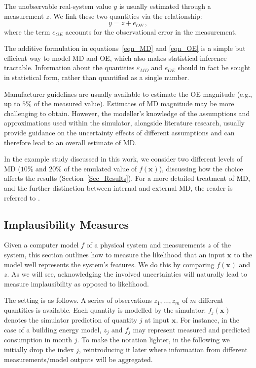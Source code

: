 \documentclass[preprint,12pt, sort&compress]{elsarticle}
\newcommand{\bd}[1]{\boldsymbol{#1}}
\newcommand{\x}[1][]{\bd{x_{#1}}}
\begin{document}
The unobservable real-system value $y$ is usually estimated through a measurement $z$. We link these two quantities via the relationship:
\begin{equation}\label{eqn_OE}
y = z + e_{OE}\,,
\end{equation}
where the term $e_{OE}$ accounts for the observational error in the measurement.

The additive formulation in equations~\eqref{eqn_MD} and \eqref{eqn_OE} is a simple but efficient way to model MD and OE, which also makes statistical inference tractable. Information about the quantities $ \varepsilon_{MD}$ and $e_{OE}$ should in fact be sought in statistical form, rather than quantified as a single number.

Manufacturer guidelines are usually available to estimate the OE magnitude (e.g., up to $5\%$ of the measured value). Estimates of MD magnitude may be more challenging to obtain. However, the modeller’s knowledge of the assumptions and approximations used within the simulator, alongside literature research, usually provide guidance on the uncertainty effects of different assumptions and can therefore lead to an overall estimate of MD.

In the example study discussed in this work, we consider two different levels of MD ($10\%$ and $20\%$ of the emulated value of $f(\x)$), discussing how the choice affects the results (Section~\ref{Sec_Results}). For a more detailed treatment of MD, and the further distinction between internal and external MD, the reader is referred to \cite{goldstein2017}.


\subsection{Implausibility Measures}\label{Subsec_IM}
Given a computer model $f$ of a physical system and measurements $z$ of the system, this section outlines how to measure the likelihood that an input $\x$ to the model well represents the system’s features. We do this by comparing $f(\x)$ and $z$. As we will see, acknowledging the involved uncertainties will naturally lead to measure implausibility as opposed to likelihood.

The setting is as follows. A series of observations $z_1, \dots, z_m$ of $m$ different quantities is available. Each quantity is modelled by the simulator: $f_j(\x)$ denotes the simulator prediction of quantity $j$ at input $\x$.  For instance, in the case of a building energy model, $z_j$ and $f_j$ may represent measured and predicted consumption in month $j$. To make the notation lighter, in the following we initially drop the index $j$, reintroducing it later where information from different measurements/model outputs will be aggregated. 
\end{document}
